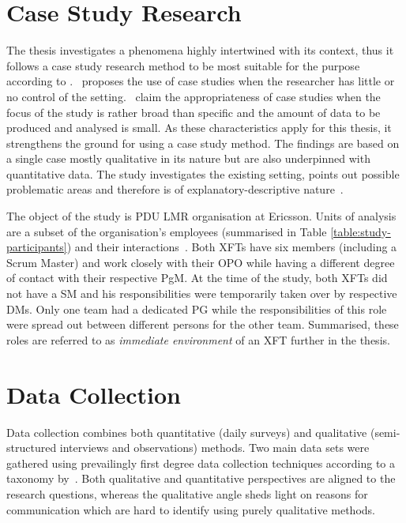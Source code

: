 \section{Case Study Research}

The thesis investigates a phenomena highly intertwined with its context, thus it follows a case study research method to be most suitable for the purpose according to \citet{runeson}.~\citet{yin2009case} proposes the use of case studies when the researcher has little or no control of the setting.~\citet{Lethbridge05studyingsoftware} claim the appropriateness of case studies when the focus of the study is rather broad than specific and the amount of data to be produced and analysed is small. As these characteristics apply for this thesis, it strengthens the ground for using a case study method.
The findings are based on a single case mostly qualitative in its nature but are also underpinned with quantitative data. The study investigates the existing setting, points out possible problematic areas and therefore is of explanatory-descriptive nature~\citep{runeson}.

The object of the study is PDU LMR organisation at Ericsson. Units of analysis are a subset of the organisation's employees (summarised in Table \ref{table:study-participants}) and their interactions~\citep{runeson}. Both \acp{XFT} have six members (including a Scrum Master) and work closely with their \ac{OPO} while having a different degree of contact with their respective \ac{PgM}. At the time of the study, both \acp{XFT} did not have a \ac{SM} and his responsibilities were temporarily taken over by respective \acp{DM}. Only one team had a dedicated \ac{PG} while the responsibilities of this role were spread out between different persons for the other team. Summarised, these roles are referred to as \emph{immediate environment} of an \ac{XFT} further in the thesis.

\section{Data Collection}

Data collection combines both quantitative (daily surveys) and qualitative (semi-structured interviews and observations) methods. Two main data sets were gathered using prevailingly first degree data collection techniques according to a taxonomy by~\citet{Lethbridge05studyingsoftware}. Both qualitative and quantitative perspectives are aligned to the research questions, whereas the qualitative angle sheds light on reasons for communication which are hard to identify using purely qualitative methods.

